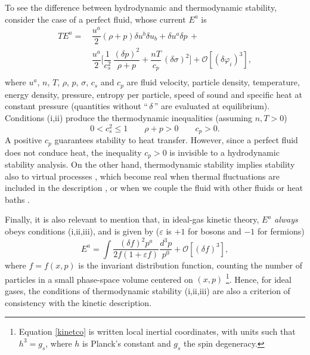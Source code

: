 \documentclass[aps,prl,reprint,nofootinbib]{revtex4-1}
\begin{document}
To see the difference between hydrodynamic and thermodynamic stability, consider the case of a perfect fluid, whose current $E^a$ is \cite{Hishcock1983,GavassinoGibbs2021,Stuekelberg1962}
\begin{equation}\label{Eaperf}
\begin{split}
TE^a = \, & \dfrac{u^a}{2} (\rho +p) \delta u^b \delta u_b +  \delta u^a \delta p  \, +\\ 
& \dfrac{u^a}{2} \bigg[\dfrac{1}{c_s^{2}} \, \dfrac{(\delta p)^2}{\rho +p} + \dfrac{nT}{c_p} \, (\delta \sigma)^2 \bigg]+\mathcal{O}[(\delta \varphi_i)^3], \\
\end{split} 
\end{equation}
where $u^a$, $n$, $T$, $\rho$, $p$, $\sigma$, $c_s$ and $c_p$ are fluid velocity, particle density, temperature, energy density, pressure, entropy per particle, speed of sound and specific heat at constant pressure (quantities without ``$\, \delta \,$'' are evaluated at equilibrium). Conditions (i,ii) produce the thermodynamic inequalities (assuming $n,T >0$)
\begin{equation}
0 <  c_s^2 \leq 1 \quad \quad \rho +p > 0  \quad \quad c_p > 0.
\end{equation} 
A positive $c_p$ guarantees stability to heat transfer. However, since a perfect fluid does not conduce heat, the inequality $c_p >0$ is invisible to a hydrodynamic stability analysis. On the other hand, thermodynamic stability implies stability also to virtual processes \cite{Callen_book}, which become real when thermal fluctuations are included in the description \cite{KovtunStickiness2011,TorrieriCrooks2020}, or when we couple the fluid with other fluids \cite{GavassinoRadiazione} or heat baths \cite{Termo,GavassinoTermometri}.

Finally, it is also relevant to mention that, in ideal-gas kinetic theory, $E^a$ \textit{always} obeys conditions (i,ii,iii), and is given by \cite{GavassinoGibbs2021,Israel_Stewart_1979} ($\varepsilon$ is $+1$ for bosons and $-1$ for fermions)
\begin{equation}\label{kinetco}
E^a = \int \dfrac{(\delta f)^2 p^a}{2f (1 +\varepsilon f)} \dfrac{d^3 p}{p^0} + \mathcal{O}[(\delta f)^3],
\end{equation}
where $f=f(x,p)$ is the invariant distribution function, counting the number of particles in a small phase-space volume centered on $(x,p)$ \footnote{Equation \eqref{kinetco} is written local inertial coordinates, with units such that $h^3=g_s$, where $h$ is Planck's constant and $g_s$ the spin degeneracy.}. Hence, for ideal gases, the conditions of thermodynamic stability (i,ii,iii) are also a criterion of consistency with the kinetic description.
\end{document}
